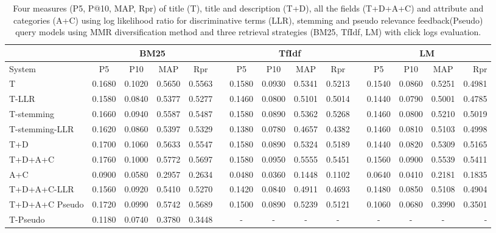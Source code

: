 \begin{table}[H]
\begin{center}
\scriptsize
\caption{
Four measures (P\@5, P@10, MAP, Rpr) of title (T), title and description (T+D), all the fields (T+D+A+C) and attribute and categories (A+C) using log likelihood ratio for discriminative terms (LLR), stemming and pseudo relevance feedback(Pseudo) query models using MMR diversification method and three retrieval strategies (BM25, TfIdf, LM)  with click logs evaluation.}
\label{table:mmrCl}

\begin{tabular}{lcccccccccccccr}
\toprule
 & \multicolumn{4}{c}{BM25} &    & \multicolumn{4}{c}{TfIdf} &    & \multicolumn{4}{c}{LM} \\
\midrule
System & P\@5 & P\@10 & MAP & Rpr &   & P\@5 & P\@10 & MAP & Rpr &   & P\@5 & P\@10 & MAP & Rpr \\
\midrule
T & 0.1680 & 0.1020 & 0.5650 & 0.5563 &   & 0.1580 & 0.0930 & 0.5341 & 0.5213 &   & 0.1540 & 0.0860 & 0.5251 & 0.4981 \\
T-LLR & 0.1580 & 0.0840 & 0.5377 & 0.5277 &   & 0.1460 & 0.0800 & 0.5101 & 0.5014 &   & 0.1440 & 0.0790 & 0.5001 & 0.4785 \\
T-stemming & 0.1660 & 0.0940 & 0.5587 & 0.5487 &   & 0.1580 & 0.0890 & 0.5362 & 0.5268 &   & 0.1460 & 0.0800 & 0.5210 & 0.5019 \\
T-stemming-LLR & 0.1620 & 0.0860 & 0.5397 & 0.5329 &   & 0.1380 & 0.0780 & 0.4657 & 0.4382 &   & 0.1460 & 0.0810 & 0.5103 & 0.4998 \\
T+D & 0.1700 & 0.1060 & 0.5633 & 0.5547 &   & 0.1580 & 0.0890 & 0.5324 & 0.5189 &   & 0.1440 & 0.0820 & 0.5309 & 0.5165 \\
T+D+A+C & 0.1760 & 0.1000 & 0.5772 & 0.5697 &   & 0.1580 & 0.0950 & 0.5555 & 0.5451 &   & 0.1560 & 0.0900 & 0.5539 & 0.5411 \\
A+C & 0.0900 & 0.0580 & 0.2957 & 0.2634 &   & 0.0480 & 0.0360 & 0.1448 & 0.1102 &   & 0.0640 & 0.0410 & 0.2181 & 0.1835 \\
T+D+A+C-LLR & 0.1560 & 0.0920 & 0.5410 & 0.5270 &   & 0.1420 & 0.0840 & 0.4911 & 0.4693 &   & 0.1480 & 0.0850 & 0.5108 & 0.4904 \\
T+D+A+C Pseudo & 0.1720 & 0.0990 & 0.5742 & 0.5689 &    & 0.1500 & 0.0890 & 0.5239 & 0.5121 &   & 0.1060 & 0.0680 & 0.3990 & 0.3501 \\
T-Pseudo & 0.1180 & 0.0740 & 0.3780 & 0.3448 &   & - & - & - & - &   & - & - & - & -   \\
\bottomrule
\end{tabular}
\end{center}
\end{table}


